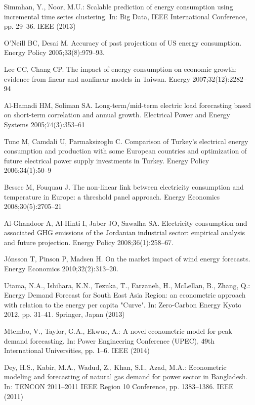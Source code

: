 \documentclass[lettersize,journal]{IEEEtran}
\begin{document}
\begin{thebibliography}{1}
  Simmhan, Y., Noor, M.U.: Scalable prediction of energy consumption using incremental time series clustering. In: Big Data, IEEE International Conference, pp. 29–36. IEEE (2013)

  O'Neill BC, Desai M. Accuracy of past projections of US energy consumption. Energy Policy 2005;33(8):979–93.

  Lee CC, Chang CP. The impact of energy consumption on economic growth: evidence from linear and nonlinear models in Taiwan. Energy 2007;32(12):2282–94

  Al-Hamadi HM, Soliman SA. Long-term/mid-term electric load forecasting based on short-term correlation and annual growth. Electrical Power and Energy Systems 2005;74(3):353–61

  Tunc M, Camdali U, Parmaksizoglu C. Comparison of Turkey's electrical energy consumption and production with some European countries and optimization of future electrical power supply investments in Turkey. Energy Policy 2006;34(1):50–9

  Bessec M, Fouquau J. The non-linear link between electricity consumption and temperature in Europe: a threshold panel approach. Energy Economics 2008;30(5):2705–21

  Al-Ghandoor A, Al-Hinti I, Jaber JO, Sawalha SA. Electricity consumption and associated GHG emissions of the Jordanian industrial sector: empirical analysis and future projection. Energy Policy 2008;36(1):258–67.

  Jónsson T, Pinson P, Madsen H. On the market impact of wind energy forecasts. Energy Economics 2010;32(2):313–20.

  Utama, N.A., Ishihara, K.N., Tezuka, T., Farzaneh, H., McLellan, B., Zhang, Q.: Energy Demand Forecast for South East Asia Region: an econometric approach with relation to the energy per capita "Curve". In: Zero-Carbon Energy Kyoto 2012, pp. 31–41. Springer, Japan (2013)

  Mtembo, V., Taylor, G.A., Ekwue, A.: A novel econometric model for peak demand forecasting. In: Power Engineering Conference (UPEC), 49th International Universities, pp. 1–6. IEEE (2014)


  Dey, H.S., Kabir, M.A., Wadud, Z., Khan, S.I., Azad, M.A.: Econometric modeling and forecasting of natural gas demand for power sector in Bangladesh. In: TENCON 2011–2011 IEEE Region 10 Conference, pp. 1383–1386. IEEE (2011)


\end{thebibliography}
\end{document}
